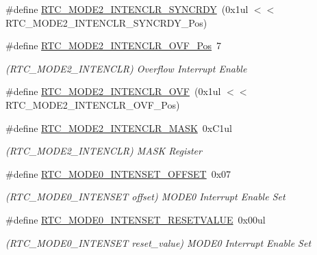 \begin{DoxyCompactItemize}
\#define \mbox{\hyperlink{group___s_a_m_d21___r_t_c_ga130724f7f5683ad9dc2afeb6d8533766}{R\+T\+C\+\_\+\+M\+O\+D\+E2\+\_\+\+I\+N\+T\+E\+N\+C\+L\+R\+\_\+\+S\+Y\+N\+C\+R\+DY}}~(0x1ul $<$$<$ R\+T\+C\+\_\+\+M\+O\+D\+E2\+\_\+\+I\+N\+T\+E\+N\+C\+L\+R\+\_\+\+S\+Y\+N\+C\+R\+D\+Y\+\_\+\+Pos)
\item 
\#define \mbox{\hyperlink{group___s_a_m_d21___r_t_c_ga80a362eccdf6500ade445ccfac078275}{R\+T\+C\+\_\+\+M\+O\+D\+E2\+\_\+\+I\+N\+T\+E\+N\+C\+L\+R\+\_\+\+O\+V\+F\+\_\+\+Pos}}~7
\begin{DoxyCompactList}\small\item\em (R\+T\+C\+\_\+\+M\+O\+D\+E2\+\_\+\+I\+N\+T\+E\+N\+C\+LR) Overflow Interrupt Enable \end{DoxyCompactList}\item 
\#define \mbox{\hyperlink{group___s_a_m_d21___r_t_c_ga79a550af9a9eba73f6f3a12ff0be2667}{R\+T\+C\+\_\+\+M\+O\+D\+E2\+\_\+\+I\+N\+T\+E\+N\+C\+L\+R\+\_\+\+O\+VF}}~(0x1ul $<$$<$ R\+T\+C\+\_\+\+M\+O\+D\+E2\+\_\+\+I\+N\+T\+E\+N\+C\+L\+R\+\_\+\+O\+V\+F\+\_\+\+Pos)
\item 
\#define \mbox{\hyperlink{group___s_a_m_d21___r_t_c_ga333990dfd2e15d1a03dcc1a2393744fc}{R\+T\+C\+\_\+\+M\+O\+D\+E2\+\_\+\+I\+N\+T\+E\+N\+C\+L\+R\+\_\+\+M\+A\+SK}}~0x\+C1ul
\begin{DoxyCompactList}\small\item\em (R\+T\+C\+\_\+\+M\+O\+D\+E2\+\_\+\+I\+N\+T\+E\+N\+C\+LR) M\+A\+SK Register \end{DoxyCompactList}\item 
\#define \mbox{\hyperlink{group___s_a_m_d21___r_t_c_gace79c596916b99bc14b07c14ccf43344}{R\+T\+C\+\_\+\+M\+O\+D\+E0\+\_\+\+I\+N\+T\+E\+N\+S\+E\+T\+\_\+\+O\+F\+F\+S\+ET}}~0x07
\begin{DoxyCompactList}\small\item\em (R\+T\+C\+\_\+\+M\+O\+D\+E0\+\_\+\+I\+N\+T\+E\+N\+S\+ET offset) M\+O\+D\+E0 Interrupt Enable Set \end{DoxyCompactList}\item 
\#define \mbox{\hyperlink{group___s_a_m_d21___r_t_c_ga73cabe63b8ff785e8c852bd67689766a}{R\+T\+C\+\_\+\+M\+O\+D\+E0\+\_\+\+I\+N\+T\+E\+N\+S\+E\+T\+\_\+\+R\+E\+S\+E\+T\+V\+A\+L\+UE}}~0x00ul
\begin{DoxyCompactList}\small\item\em (R\+T\+C\+\_\+\+M\+O\+D\+E0\+\_\+\+I\+N\+T\+E\+N\+S\+ET reset\+\_\+value) M\+O\+D\+E0 Interrupt Enable Set \end{DoxyCompactList}\item 

\end{DoxyCompactItemize}
